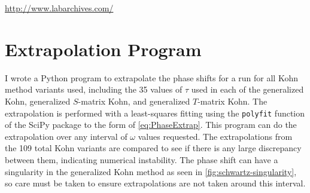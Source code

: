 \documentclass[Dissertation.tex]{subfiles}
\begin{document}
\url{http://www.labarchives.com/}

\cite{GitHub}
\cite{Wiki}
\cite{figshare}



\section{Extrapolation Program}
I wrote a Python \cite{Python} program to extrapolate the phase shifts for a 
run for all Kohn method variants used, including the 35 values of $\tau$ used 
in each of the generalized Kohn, generalized $S$-matrix Kohn, and generalized
$T$-matrix Kohn. The extrapolation is performed with a least-squares fitting 
using the \texttt{polyfit} function of the SciPy package \cite{SciPy} to the 
form of \cref{eq:PhaseExtrap}. This program can do the extrapolation over any 
interval of $\omega$ values requested. The extrapolations from the 109 total 
Kohn variants are compared to see if there is any large discrepancy between 
them, indicating numerical instability. The phase shift can have a 
singularity in the generalized Kohn method as seen in \cref{fig:schwartz-singularity}, so 
care must be taken to ensure extrapolations are not taken around this interval.


\biblio
\end{document}
